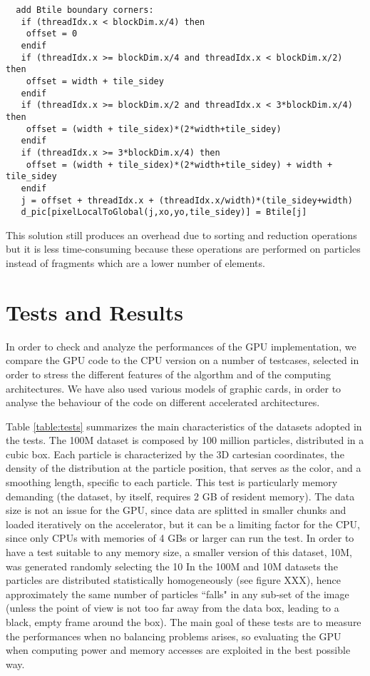 \documentclass[11pt]{article}
\begin{document}
\begin{verbatim}
  add Btile boundary corners:
   if (threadIdx.x < blockDim.x/4) then
    offset = 0
   endif
   if (threadIdx.x >= blockDim.x/4 and threadIdx.x < blockDim.x/2) then
    offset = width + tile_sidey
   endif
   if (threadIdx.x >= blockDim.x/2 and threadIdx.x < 3*blockDim.x/4) then
    offset = (width + tile_sidex)*(2*width+tile_sidey)
   endif
   if (threadIdx.x >= 3*blockDim.x/4) then
    offset = (width + tile_sidex)*(2*width+tile_sidey) + width + tile_sidey
   endif
   j = offset + threadIdx.x + (threadIdx.x/width)*(tile_sidey+width)
   d_pic[pixelLocalToGlobal(j,xo,yo,tile_sidey)] = Btile[j]

\end{verbatim}
\normalsize
This solution still produces an overhead due to sorting and reduction operations but it is less time-consuming because these operations are performed on particles instead of fragments which are a lower number of elements.   

\section{Tests and Results}

In order to check and analyze the performances of the GPU implementation,
we compare the GPU code to the CPU version on a number of testcases, selected in 
order to stress the different features of the algorthm and of the computing 
architectures. We have also used various models of graphic cards, in order to analyse
the behaviour of the code on different accelerated architectures.

Table \ref{table:tests} summarizes the main characteristics of the datasets adopted in the 
tests. The 100M dataset is composed by 100 million particles, distributed in 
a cubic box. Each particle is characterized by the 3D cartesian coordinates,
the density of the distribution at the particle position, that serves as the color,
and a smoothing length, specific to each particle. This test is particularly 
memory demanding (the dataset, by itself, requires 2 GB 
of resident memory). The data size is not an issue for the GPU, since data are splitted 
in smaller chunks and loaded iteratively on the accelerator, but it can be a limiting factor
for the CPU, since only CPUs with memories of 4 GBs or larger can run the test. 
In order to have a test suitable to any memory size, a smaller version of this dataset, 10M, was generated 
randomly selecting the 10%
In the 100M and 10M datasets the particles are distributed 
statistically homogeneously (see figure XXX), hence approximately the same 
number of particles ``falls" in any sub-set of the image (unless
the point of view is not too far away from the data box, leading to a black, empty 
frame around the box). The main goal of these tests are to measure the performances
when no balancing problems arises, so evaluating the GPU when computing 
power and memory accesses are exploited in the best possible way. 
\end{document}
